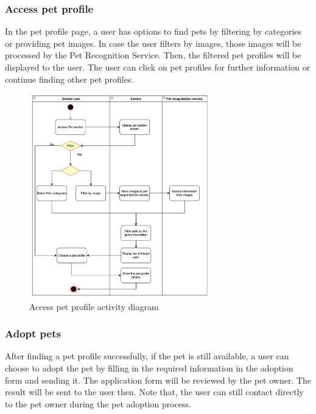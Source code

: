 \subsubsection{Access pet profile}

In the pet profile page, a user has options to find pets by filtering by categories or providing pet images. In case the user filters by images, those images will be processed by the Pet Recognition Service. Then, the filtered pet profiles will be displayed to the user. The user can click on pet profiles for further information or continue finding other pet profiles.

\begin{figure}[H]
  \centering
  \includegraphics[width=0.7\textwidth]{Figures/access_pet.png}
  \caption{Access pet profile activity diagram}
  \label{fig:access-pet}
\end{figure}

\subsubsection{Adopt pets}

After finding a pet profile successfully, if the pet is still available, a user can choose to adopt the pet by filling in the required information in the adoption form and sending it. The application form will be reviewed by the pet owner. The result will be sent to the user then. Note that, the user can still contact directly to the pet owner during the pet adoption process.

